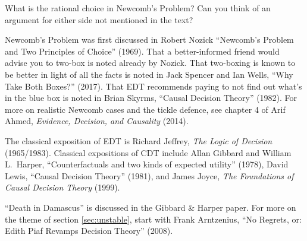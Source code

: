 \begin{essay}
  What is the rational choice in Newcomb's Problem? Can you think of an argument
  for either side not mentioned in the text?
\end{essay}

\begin{sources}

  Newcomb's Problem was first discussed in Robert Nozick ``Newcomb's Problem and
  Two Principles of Choice'' (1969). That a better-informed friend would advise
  you to two-box is noted already by Nozick. That two-boxing is known to be
  better in light of all the facts is noted in Jack Spencer and Ian Wells, ``Why
  Take Both Boxes?'' (2017). That EDT recommends paying to not find out what's
  in the blue box is noted in Brian Skyrms, ``Causal Decision Theory'' (1982).
  For more on realistic Newcomb cases and the tickle defence, see chapter 4 of
  Arif Ahmed, \emph{Evidence, Decision, and Causality} (2014).

  The classical exposition of EDT is Richard Jeffrey, \emph{The Logic of
    Decision} (1965/1983). Classical expositions of CDT include Allan Gibbard
  and William L.\ Harper, ``Counterfactuals and two kinds of expected utility''
  (1978), David Lewis, ``Causal Decision Theory'' (1981), and James Joyce,
  \emph{The Foundations of Causal Decision Theory} (1999). 
  
  ``Death in Damascus'' is discussed in the Gibbard \& Harper paper. For more on
  the theme of section \ref{sec:unstable}, start with Frank Arntzenius, ``No
  Regrets, or: Edith Piaf Revamps Decision Theory'' (2008).


\end{sources}



